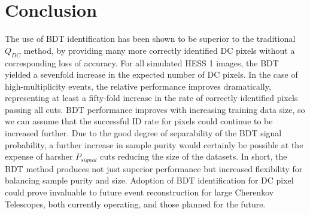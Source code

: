 \documentclass[]{article}
\begin{document}
\section{Conclusion}
The use of BDT identification has been shown to be superior to the traditional $Q_{DC}$ method, by providing many more correctly identified DC pixels without a corresponding loss of accuracy. For all simulated HESS 1 images, the BDT yielded a sevenfold increase in the expected number of DC pixels. In the case of high-multiplicity events, the relative performance improves dramatically, representing at least a fifty-fold increase in the rate of correctly identified pixels passing all cuts. BDT performance improves with increasing training data size, so we can assume that the successful ID rate for pixels could continue to be increased further. Due to the good degree of separability of the BDT signal probability, a further increase in sample purity would certainly be possible at the expense of harsher $P_{signal}$ cuts reducing the size of the datasets. In short, the BDT method produces not just superior performance but increased flexibility for balancing sample purity and size. Adoption of BDT identification for DC pixel could prove invaluable to future event reconstruction for large Cherenkov Telescopes, both currently operating, and those planned for the future.


\end{document}
